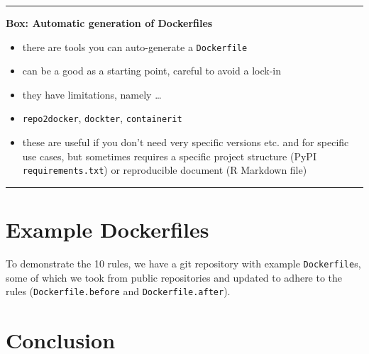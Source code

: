 \documentclass[10pt,letterpaper]{article}
\providecommand{\tightlist}{%
  \setlength{\itemsep}{0pt}\setlength{\parskip}{0pt}}
\begin{document}
\begin{center}\rule{0.5\linewidth}{\linethickness}\end{center}

\textbf{Box: Automatic generation of Dockerfiles}

\begin{itemize}
\tightlist
\item
  there are tools you can auto-generate a \texttt{Dockerfile}
\item
  can be a good as a starting point, careful to avoid a lock-in
\item
  they have limitations, namely \ldots{}
\item
  \texttt{repo2docker}, \texttt{dockter}, \texttt{containerit}
\item
  these are useful if you don't need very specific versions etc. and for
  specific use cases, but sometimes requires a specific project
  structure (PyPI \texttt{requirements.txt}) or reproducible document (R
  Markdown file)
\end{itemize}

\begin{center}\rule{0.5\linewidth}{\linethickness}\end{center}

\hypertarget{example-dockerfiles}{%
\section{Example Dockerfiles}\label{example-dockerfiles}}

To demonstrate the 10 rules, we have a git repository with example
\texttt{Dockerfile}s, some of which we took from public repositories and
updated to adhere to the rules (\texttt{Dockerfile.before} and
\texttt{Dockerfile.after}).

\hypertarget{conclusion}{%
\section*{Conclusion}\label{conclusion}}
\end{document}
